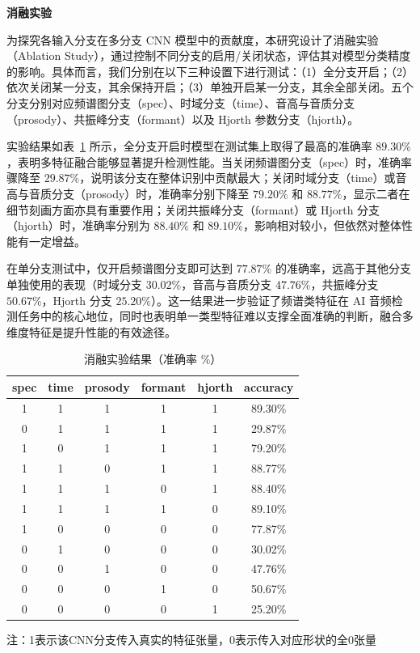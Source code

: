 \documentclass[a4paper,12pt]{article}
\begin{document}
\noindent\textbf{消融实验}\par

为探究各输入分支在多分支 CNN 模型中的贡献度，本研究设计了消融实验（Ablation Study），通过控制不同分支的启用/关闭状态，评估其对模型分类精度的影响。具体而言，我们分别在以下三种设置下进行测试：（1）全分支开启；（2）依次关闭某一分支，其余保持开启；（3）单独开启某一分支，其余全部关闭。五个分支分别对应频谱图分支（spec）、时域分支（time）、音高与音质分支（prosody）、共振峰分支（formant）以及 Hjorth 参数分支（hjorth）。

实验结果如表~\ref{tab:ablation} 所示，全分支开启时模型在测试集上取得了最高的准确率 $89.30\%$，表明多特征融合能够显著提升检测性能。当关闭频谱图分支（spec）时，准确率骤降至 $29.87\%$，说明该分支在整体识别中贡献最大；关闭时域分支（time）或音高与音质分支（prosody）时，准确率分别下降至 $79.20\%$ 和 $88.77\%$，显示二者在细节刻画方面亦具有重要作用；关闭共振峰分支（formant）或 Hjorth 分支（hjorth）时，准确率分别为 $88.40\%$ 和 $89.10\%$，影响相对较小，但依然对整体性能有一定增益。

在单分支测试中，仅开启频谱图分支即可达到 $77.87\%$ 的准确率，远高于其他分支单独使用的表现（时域分支 $30.02\%$，音高与音质分支 $47.76\%$，共振峰分支 $50.67\%$，Hjorth 分支 $25.20\%$）。这一结果进一步验证了频谱类特征在 AI 音频检测任务中的核心地位，同时也表明单一类型特征难以支撑全面准确的判断，融合多维度特征是提升性能的有效途径。

\begin{table}[htbp]
\centering
\begin{threeparttable}
\caption{消融实验结果（准确率 \%）}
\label{tab:ablation}
\begin{tabular}{cccccc}
\toprule
spec & time & prosody & formant & hjorth & accuracy \\
\midrule
1 & 1 & 1 & 1 & 1 & 89.30\% \\
0 & 1 & 1 & 1 & 1 & 29.87\% \\
1 & 0 & 1 & 1 & 1 & 79.20\% \\
1 & 1 & 0 & 1 & 1 & 88.77\% \\
1 & 1 & 1 & 0 & 1 & 88.40\% \\
1 & 1 & 1 & 1 & 0 & 89.10\% \\
1 & 0 & 0 & 0 & 0 & 77.87\% \\
0 & 1 & 0 & 0 & 0 & 30.02\% \\
0 & 0 & 1 & 0 & 0 & 47.76\% \\
0 & 0 & 0 & 1 & 0 & 50.67\% \\
0 & 0 & 0 & 0 & 1 & 25.20\% \\
\bottomrule
\end{tabular}
\begin{tablenotes}
\footnotesize
\item 注：1表示该CNN分支传入真实的特征张量，0表示传入对应形状的全0张量
\end{tablenotes}
\end{threeparttable}
\end{table}
\end{document}
